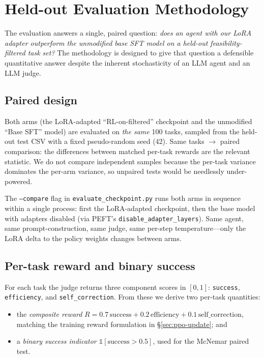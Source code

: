\documentclass[12pt,a4paper]{report}
\begin{document}
\section{Held-out Evaluation Methodology}\label{sec:eval-method}

The evaluation answers a single, paired question: \emph{does an agent with our LoRA adapter outperform the unmodified base SFT model on a held-out feasibility-filtered task set?} The methodology is designed to give that question a defensible quantitative answer despite the inherent stochasticity of an LLM agent and an LLM judge.

\subsection*{Paired design}

Both arms (the LoRA-adapted ``RL-on-filtered'' checkpoint and the unmodified ``Base SFT'' model) are evaluated on \emph{the same} 100 tasks, sampled from the held-out test CSV with a fixed pseudo-random seed (42). Same tasks $\to$ paired comparison: the differences between matched per-task rewards are the relevant statistic. We do not compare independent samples because the per-task variance dominates the per-arm variance, so unpaired tests would be needlessly under-powered.

The \texttt{--compare} flag in \texttt{evaluate\_checkpoint.py} runs both arms in sequence within a single process: first the LoRA-adapted checkpoint, then the base model with adapters disabled (via PEFT's \texttt{disable\_adapter\_layers}). Same agent, same prompt-construction, same judge, same per-step temperature---only the LoRA delta to the policy weights changes between arms.

\subsection*{Per-task reward and binary success}

For each task the judge returns three component scores in $[0, 1]$: \texttt{success}, \texttt{efficiency}, and \texttt{self\_correction}. From these we derive two per-task quantities:
\begin{itemize}
  \item the \emph{composite reward} $R = 0.7\,\text{success} + 0.2\,\text{efficiency} + 0.1\,\text{self\_correction}$, matching the training reward formulation in \S\ref{sec:ppo-update}; and
  \item a \emph{binary success indicator} $\mathbb{1}[\text{success} > 0.5]$, used for the McNemar paired test.
\end{itemize}
\end{document}
